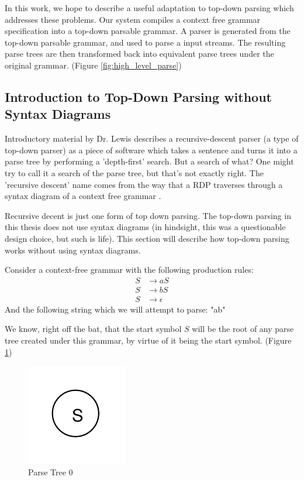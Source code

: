 \documentclass[11pt]{article}
\begin{document}
In this work, we hope to describe a useful adaptation to top-down parsing
which addresses these problems. Our system compiles a context free grammar 
specification into a top-down parsable grammar.
A parser is generated from the top-down parsable grammar,
and used to parse a input streams. 
The resulting parse trees are then transformed back into equivalent
parse trees under the original grammar. (Figure \ref{fig:high_level_parse})

\subsection{Introduction to Top-Down Parsing without Syntax Diagrams}
\label{rd_wo_sd}
Introductory material by Dr. Lewis \cite{lewis} describes a recursive-descent parser (a type of top-down parser)
as a piece of software which takes a sentence and turns it into a parse tree by performing a 'depth-first' search. 
But a search of what? One might try to call it a search of the parse tree, but that's not exactly right.
The 'recursive descent' name comes from the way that a RDP traverses through a
syntax diagram of a context free grammar \cite{compiler}.

Recursive decent is just one form of top down parsing. The top-down parsing in this thesis
does not use syntax diagrams (in hindsight, this was a questionable design choice, 
but such is life). This section will describe how top-down parsing works without
using syntax diagrams.

Consider a context-free grammar with the following production rules:
\setcounter{equation}{0}
\begin{align}
S &\rightarrow a S\\
S &\rightarrow b S\\
S &\rightarrow \epsilon
\end{align}
And the following string which we will attempt to parse: "ab"

We know, right off the bat, that the start symbol $S$ will be the root of any parse tree created under this
grammar, by virtue of it being the start symbol. (Figure \ref{fig:rdp_0})

\begin{figure}[h!]
    \centering
    \includegraphics[natwidth=15,natheight=15]{umlet/rdp_0.pdf}
    \caption{Parse Tree 0}
    \label{fig:rdp_0}
\end{figure}
\end{document}
